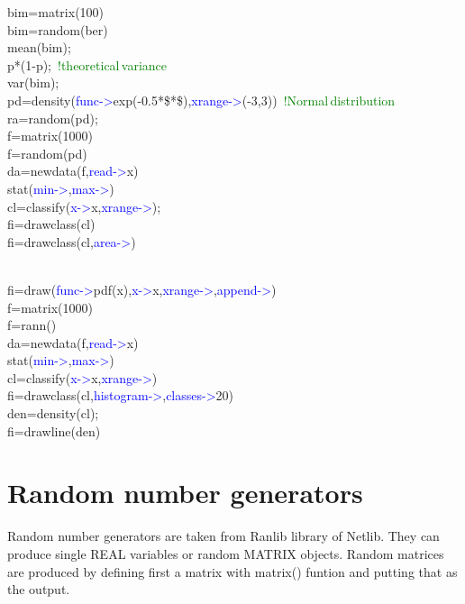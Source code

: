 \begin{itemize}
\begin{example}[densityex]
bim=\textcolor{VioletRed}{matrix}(100)\\
bim=\textcolor{VioletRed}{random}(ber)\\
\textcolor{VioletRed}{mean}(bim);\\
p*(1-p); \,\textcolor{green}{!theoretical\,variance}\\
\textcolor{VioletRed}{var}(bim);\\
pd=\textcolor{VioletRed}{density}(\textcolor{blue}{func->}\textcolor{VioletRed}{exp}(-0.5*\$*\$),\textcolor{blue}{xrange->}(-3,3)) \,\textcolor{green}{!Normal\,distribution}
\\
ra=\textcolor{VioletRed}{random}(pd);\\
f=\textcolor{VioletRed}{matrix}(1000)\\
f=\textcolor{VioletRed}{random}(pd)\\
da=\textcolor{VioletRed}{newdata}(f,\textcolor{blue}{read->}x)\\
\textcolor{VioletRed}{stat}(\textcolor{blue}{min->},\textcolor{blue}{max->})\\
cl=\textcolor{VioletRed}{classify}(\textcolor{blue}{x->}x,\textcolor{blue}{xrange->});\\
fi=\textcolor{VioletRed}{drawclass}(cl)\\
fi=\textcolor{VioletRed}{drawclass}(cl,\textcolor{blue}{area->})

\\
fi=\textcolor{VioletRed}{draw}(\textcolor{blue}{func->}\textcolor{VioletRed}{pdf}(x),\textcolor{blue}{x->}x,\textcolor{blue}{xrange->},\textcolor{blue}{append->})\\
f=\textcolor{VioletRed}{matrix}(1000)\\
f=\textcolor{VioletRed}{rann}()\\
da=\textcolor{VioletRed}{newdata}(f,\textcolor{blue}{read->}x)\\
\textcolor{VioletRed}{stat}(\textcolor{blue}{min->},\textcolor{blue}{max->})\\
cl=\textcolor{VioletRed}{classify}(\textcolor{blue}{x->}x,\textcolor{blue}{xrange->})\\
fi=\textcolor{VioletRed}{drawclass}(cl,\textcolor{blue}{histogram->},\textcolor{blue}{classes->}20)\\
den=\textcolor{VioletRed}{density}(cl);\\
fi=\textcolor{VioletRed}{drawline}(den)
\end{example}
\section{Random number generators}
\label{randomgen}
Random number generators are taken from Ranlib library of Netlib.
They can produce single REAL variables or random MATRIX objects.
Random matrices are produced by defining first a matrix with \textcolor{VioletRed}{matrix}()
funtion and putting that as the output.

\end{itemize}
